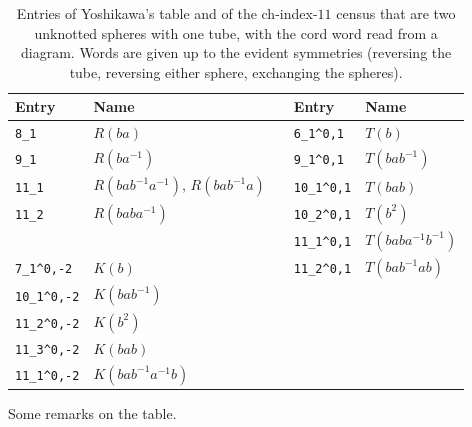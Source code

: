 \documentclass[11pt]{amsart}
\newcommand{\lab}[1]{\texttt{#1}}
\newcommand{\inv}{^{-1}}
\theoremstyle{plain}
\theoremstyle{remark}
\begin{document}
\begin{table}[ht]
\centering
\small
\begin{tabular}{@{}llp{}ll@{}}
\toprule
Entry & Name & & Entry & Name \\
\midrule
\lab{8\_1} & $R(ba)$ & & \lab{6\_1\^{}0,1} & $T(b)$ \\
\lab{9\_1} & $R(ba\inv)$ & & \lab{9\_1\^{}0,1} & $T(bab\inv)$ \\
\lab{11\_1} & $R(bab\inv a\inv)$, $R(bab\inv a)$ & & \lab{10\_1\^{}0,1} & $T(bab)$ \\
\lab{11\_2} & $R(baba\inv)$ & & \lab{10\_2\^{}0,1} & $T(b^2)$ \\
 & & & \lab{11\_1\^{}0,1} & $T(baba\inv b\inv)$ \\
\lab{7\_1\^{}0,-2} & $K(b)$ & & \lab{11\_2\^{}0,1} & $T(bab\inv ab)$ \\
\lab{10\_1\^{}0,-2} & $K(bab\inv)$ & & & \\
\lab{11\_2\^{}0,-2} & $K(b^2)$ & & & \\
\lab{11\_3\^{}0,-2} & $K(bab)$ & & & \\
\lab{11\_1\^{}0,-2} & $K(bab\inv a\inv b)$ & & & \\
\bottomrule
\end{tabular}
\caption{Entries of Yoshikawa's table and of the ch-index-$11$ census that are two unknotted spheres with
one tube, with the cord word read from a diagram. Words are given up to the evident symmetries (reversing
the tube, reversing either sphere, exchanging the spheres).}
\label{tab:names}
\end{table}

Some remarks on the table.
\end{document}
